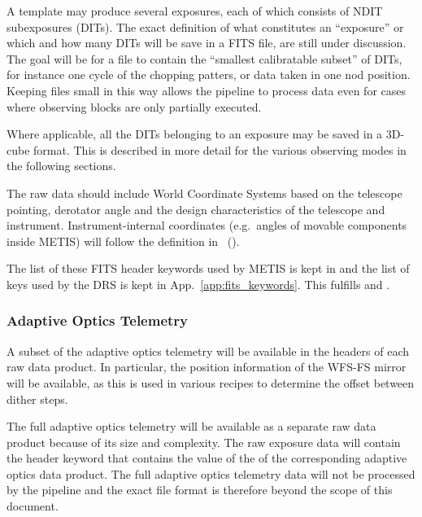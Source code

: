 A template may produce several exposures, each of which consists of
NDIT subexposures (DITs). The exact definition of what constitutes an
``exposure'' or which and how many DITs will be save in a FITS file,
are still under discussion. The goal will be for a file to contain the
``smallest calibratable subset'' of DITs, for instance one cycle of
the chopping patters, or data taken in one nod position. Keeping files
small in this way allows the pipeline to process data even for cases
where observing blocks are only partially executed.

Where applicable, all the DITs belonging to an exposure may be saved
in a 3D-cube format. This is described in more detail for the various
observing modes in the following sections.

The raw data should include World Coordinate Systems based on the
telescope pointing, derotator angle and the design characteristics of
the telescope and instrument. Instrument-internal coordinates
(e.g.~angles of movable components inside METIS) will follow the
definition in~\cite{METIS-coordinates} ().

The list of these FITS header keywords used by METIS is kept in
\cite{METIS-DID} and the list of keys used by the \acs{DRS} is kept in App.~\ref{app:fits_keywords}. This fulfills  and .


\subsubsection{Adaptive Optics Telemetry}
A subset of the adaptive optics telemetry will be available in the headers of each raw data product.
In particular, the position information of the \ac{WFS-FS} mirror will be available, as this is used in various recipes to determine the offset between dither steps.

The full adaptive optics telemetry will be available as a separate raw data product because of its size and complexity.
The raw exposure data will contain the  header keyword that contains the value of the  of the corresponding adaptive optics data product.
The full adaptive optics telemetry data will not be processed by the pipeline and the exact file format is therefore beyond the scope of this document.

